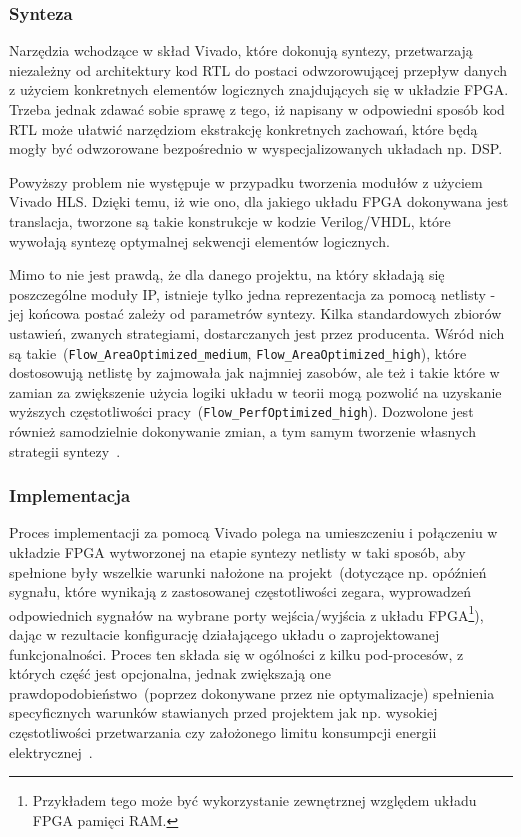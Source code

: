 \subsubsection{Synteza}
Narzędzia wchodzące w skład Vivado, które dokonują syntezy, przetwarzają niezależny od architektury kod RTL do postaci odwzorowującej przepływ danych z użyciem konkretnych elementów logicznych znajdujących się w układzie FPGA. Trzeba jednak zdawać sobie sprawę z tego, iż napisany w odpowiedni sposób kod RTL może ułatwić narzędziom ekstrakcję konkretnych zachowań, które będą mogły być odwzorowane bezpośrednio w wyspecjalizowanych układach np. DSP. 

Powyższy problem nie występuje w przypadku tworzenia modułów z użyciem Vivado HLS. Dzięki temu, iż wie ono, dla jakiego układu FPGA dokonywana jest translacja, tworzone są takie konstrukcje w kodzie Verilog/VHDL, które wywołają syntezę optymalnej sekwencji elementów logicznych. 

Mimo to nie jest prawdą, że dla danego projektu, na który składają się poszczególne moduły IP, istnieje tylko jedna reprezentacja za pomocą netlisty - jej końcowa postać zależy od parametrów syntezy. Kilka standardowych zbiorów ustawień, zwanych strategiami, dostarczanych jest przez producenta. Wśród nich są takie~(\texttt{Flow\_AreaOptimized\_medium}, \texttt{Flow\_AreaOptimized\_high}), które dostosowują netlistę by zajmowała jak najmniej zasobów, ale też i takie które w zamian za zwiększenie użycia logiki układu w teorii mogą pozwolić na uzyskanie wyższych częstotliwości pracy~(\texttt{Flow\_PerfOptimized\_high}). Dozwolone jest również samodzielnie dokonywanie zmian, a tym samym tworzenie własnych strategii syntezy~\cite{UG901}. 

\subsubsection{Implementacja}
Proces implementacji za pomocą Vivado polega na umieszczeniu i połączeniu w układzie FPGA wytworzonej na etapie syntezy netlisty w taki sposób, aby spełnione były wszelkie warunki nałożone na projekt~(dotyczące np. opóźnień sygnału, które wynikają z zastosowanej częstotliwości zegara, wyprowadzeń odpowiednich sygnałów na wybrane porty wejścia/wyjścia z układu FPGA\footnote{Przykładem tego może być wykorzystanie zewnętrznej względem układu FPGA pamięci RAM.}), dając w rezultacie konfigurację działającego układu o zaprojektowanej funkcjonalności. Proces ten składa się w ogólności z kilku pod-procesów, z których część jest opcjonalna, jednak zwiększają one prawdopodobieństwo~(poprzez dokonywane przez nie optymalizacje) spełnienia specyficznych warunków stawianych przed projektem jak np. wysokiej częstotliwości przetwarzania czy założonego limitu konsumpcji energii elektrycznej~\cite{UG904}. 

